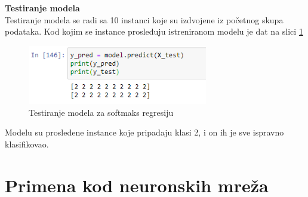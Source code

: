 \documentclass[a4paper,12pt]{report}
\begin{document}
\textbf{Testiranje modela}\\

Testiranje modela se radi sa 10 instanci koje su izdvojene iz početnog skupa podataka. Kod kojim se instance prosleđuju istreniranom modelu je dat na slici \ref{fig:softmaxtest}

\begin{figure}[h]
    \centering
    \includegraphics[width=0.7\textwidth]{softmax_test.png}
    \caption{Testiranje modela za softmaks regresiju}\label{fig:softmaxtest}
\end{figure}

Modelu su prosleđene instance koje pripadaju klasi 2, i on ih je sve ispravno klasifikovao. \\

\chapter{Primena kod neuronskih mreža}
\end{document}

